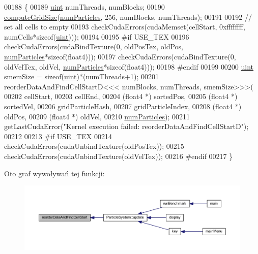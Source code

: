 \begin{DoxyCode}
00188     \{
00189         \hyperlink{particles__kernel_8cuh_a91ad9478d81a7aaf2593e8d9c3d06a14}{uint} numThreads, numBlocks;
00190         \hyperlink{particle_system__cuda_8cu_a78e8aa50e0629b57cff219a2fa753ed0}{computeGridSize}(\hyperlink{particles_8cpp_a05b8a90212054a3eb1a036ae0c269596}{numParticles}, 256, numBlocks, numThreads);
00191 
00192         \textcolor{comment}{// set all cells to empty}
00193         checkCudaErrors(cudaMemset(cellStart, 0xffffffff, numCells*\textcolor{keyword}{sizeof}(\hyperlink{particles__kernel_8cuh_a91ad9478d81a7aaf2593e8d9c3d06a14}{uint})));
00194 
00195 \textcolor{preprocessor}{#if USE\_TEX}
00196 \textcolor{preprocessor}{}        checkCudaErrors(cudaBindTexture(0, oldPosTex, oldPos, \hyperlink{particles_8cpp_a05b8a90212054a3eb1a036ae0c269596}{numParticles}*\textcolor{keyword}{sizeof}(float4)));
00197         checkCudaErrors(cudaBindTexture(0, oldVelTex, oldVel, \hyperlink{particles_8cpp_a05b8a90212054a3eb1a036ae0c269596}{numParticles}*\textcolor{keyword}{sizeof}(float4)));
00198 \textcolor{preprocessor}{#endif}
00199 \textcolor{preprocessor}{}
00200         \hyperlink{particles__kernel_8cuh_a91ad9478d81a7aaf2593e8d9c3d06a14}{uint} smemSize = \textcolor{keyword}{sizeof}(\hyperlink{particles__kernel_8cuh_a91ad9478d81a7aaf2593e8d9c3d06a14}{uint})*(numThreads+1);
00201         reorderDataAndFindCellStartD<<< numBlocks, numThreads, smemSize>>>(
00202             cellStart,
00203             cellEnd,
00204             (float4 *) sortedPos,
00205             (float4 *) sortedVel,
00206             gridParticleHash,
00207             gridParticleIndex,
00208             (float4 *) oldPos,
00209             (float4 *) oldVel,
00210             \hyperlink{particles_8cpp_a05b8a90212054a3eb1a036ae0c269596}{numParticles});
00211         getLastCudaError(\textcolor{stringliteral}{"Kernel execution failed: reorderDataAndFindCellStartD"});
00212 
00213 \textcolor{preprocessor}{#if USE\_TEX}
00214 \textcolor{preprocessor}{}        checkCudaErrors(cudaUnbindTexture(oldPosTex));
00215         checkCudaErrors(cudaUnbindTexture(oldVelTex));
00216 \textcolor{preprocessor}{#endif}
00217 \textcolor{preprocessor}{}    \}
\end{DoxyCode}


Oto graf wywoływań tej funkcji\-:\nopagebreak
\begin{figure}[H]
\begin{center}
\leavevmode
\includegraphics[width=350pt]{particle_system_8cuh_ac72ccd068434c46c2f901c751d53be1d_icgraph}
\end{center}
\end{figure}


